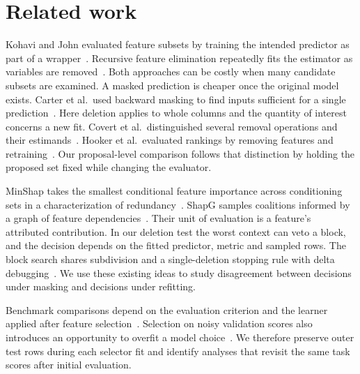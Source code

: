 \section{Related work}
Kohavi and John evaluated feature subsets by training the intended predictor as part of a wrapper~\cite{kohavi1997wrappers}. Recursive feature elimination repeatedly fits the estimator as variables are removed~\cite{guyon2002rfe}. Both approaches can be costly when many candidate subsets are examined. A masked prediction is cheaper once the original model exists. Carter et al.\ used backward masking to find inputs sufficient for a single prediction~\cite{carter2019sufficient}. Here deletion applies to whole columns and the quantity of interest concerns a new fit. Covert et al.\ distinguished several removal operations and their estimands~\cite{covert2021removing}. Hooker et al.\ evaluated rankings by removing features and retraining~\cite{hooker2019roar}. Our proposal-level comparison follows that distinction by holding the proposed set fixed while changing the evaluator.

MinShap takes the smallest conditional feature importance across conditioning sets in a characterization of redundancy~\cite{zheng2026minshap}. ShapG samples coalitions informed by a graph of feature dependencies~\cite{zhao2025shapg}. Their unit of evaluation is a feature's attributed contribution. In our deletion test the worst context can veto a block, and the decision depends on the fitted predictor, metric and sampled rows. The block search shares subdivision and a single-deletion stopping rule with delta debugging~\cite{zeller2002ddmin}. We use these existing ideas to study disagreement between decisions under masking and decisions under refitting.

Benchmark comparisons depend on the evaluation criterion and the learner applied after feature selection~\cite{bommert2020filters}. Selection on noisy validation scores also introduces an opportunity to overfit a model choice~\cite{cawley2010selection}. We therefore preserve outer test rows during each selector fit and identify analyses that revisit the same task scores after initial evaluation.
